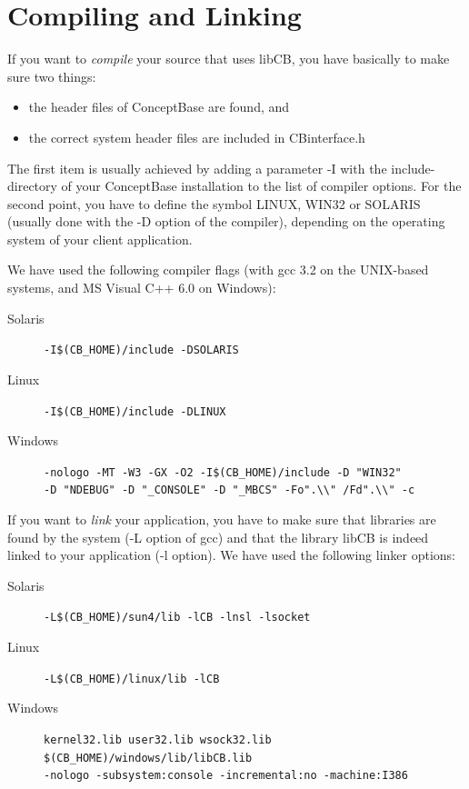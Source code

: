 

\section{Compiling and Linking}
\label{sec:compileandlink}

If you want to {\em compile} your source that uses libCB, you have basically
to make sure two things:

\begin{itemize}
\item the header files of ConceptBase are found, and
\item the correct system header files are included in {\ttfamily CBinterface.h}
\end{itemize}

The first item is usually achieved by adding a parameter -I with
the include-directory of your ConceptBase installation to the list of
compiler options. For the second point, you have to define the symbol
LINUX, WIN32 or SOLARIS (usually done with the -D option of the compiler),
depending on the operating system of your client application.

We have used the following compiler flags (with gcc 3.2 on the UNIX-based
systems, and MS Visual C++ 6.0 on Windows):

\begin{description}
\item[Solaris] \verb+-I$(CB_HOME)/include -DSOLARIS+
\item[Linux] \verb+-I$(CB_HOME)/include -DLINUX+
\item[Windows] \verb+-nologo -MT -W3 -GX -O2 -I$(CB_HOME)/include -D "WIN32"+ \\
\verb+-D "NDEBUG" -D "_CONSOLE" -D "_MBCS" -Fo".\\" /Fd".\\" -c +
\end{description}

If you want to {\em link} your application, you have to make sure that libraries
are found by the system (-L option of gcc) and that the library libCB is indeed
linked to your application (-l option). We have used the following linker options:

\begin{description}
\item[Solaris] \verb+-L$(CB_HOME)/sun4/lib -lCB -lnsl -lsocket+
\item[Linux] \verb+-L$(CB_HOME)/linux/lib -lCB+
\item[Windows] \verb+kernel32.lib user32.lib wsock32.lib $(CB_HOME)/windows/lib/libCB.lib+ \\
      \verb+-nologo -subsystem:console -incremental:no -machine:I386+
\end{description}

